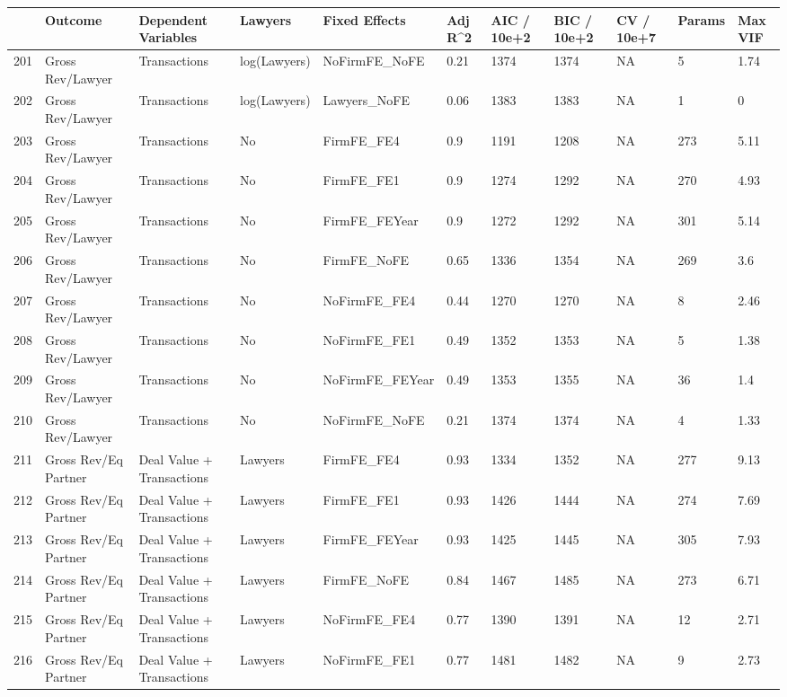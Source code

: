 \documentclass{article}
\begin{document}
\begin{table}[H]
\centering
\begin{tabular}{rllllllllll}
  \hline
 & Outcome & Dependent Variables & Lawyers & Fixed Effects & Adj R^2 & AIC / 10e+2 & BIC / 10e+2 & CV / 10e+7 & Params & Max VIF \\
  \hline
201 & Gross Rev/Lawyer & Transactions & log(Lawyers) & NoFirmFE\_NoFE & 0.21 & 1374 & 1374 & NA & 5 & 1.74 \\
  202 & Gross Rev/Lawyer & Transactions & log(Lawyers) & Lawyers\_NoFE & 0.06 & 1383 & 1383 & NA & 1 & 0 \\
  203 & Gross Rev/Lawyer & Transactions & No & FirmFE\_FE4 & 0.9 & 1191 & 1208 & NA & 273 & 5.11 \\
  204 & Gross Rev/Lawyer & Transactions & No & FirmFE\_FE1 & 0.9 & 1274 & 1292 & NA & 270 & 4.93 \\
  205 & Gross Rev/Lawyer & Transactions & No & FirmFE\_FEYear & 0.9 & 1272 & 1292 & NA & 301 & 5.14 \\
  206 & Gross Rev/Lawyer & Transactions & No & FirmFE\_NoFE & 0.65 & 1336 & 1354 & NA & 269 & 3.6 \\
  207 & Gross Rev/Lawyer & Transactions & No & NoFirmFE\_FE4 & 0.44 & 1270 & 1270 & NA & 8 & 2.46 \\
  208 & Gross Rev/Lawyer & Transactions & No & NoFirmFE\_FE1 & 0.49 & 1352 & 1353 & NA & 5 & 1.38 \\
  209 & Gross Rev/Lawyer & Transactions & No & NoFirmFE\_FEYear & 0.49 & 1353 & 1355 & NA & 36 & 1.4 \\
  210 & Gross Rev/Lawyer & Transactions & No & NoFirmFE\_NoFE & 0.21 & 1374 & 1374 & NA & 4 & 1.33 \\
  211 & Gross Rev/Eq Partner & Deal Value + Transactions & Lawyers & FirmFE\_FE4 & 0.93 & 1334 & 1352 & NA & 277 & 9.13 \\
  212 & Gross Rev/Eq Partner & Deal Value + Transactions & Lawyers & FirmFE\_FE1 & 0.93 & 1426 & 1444 & NA & 274 & 7.69 \\
  213 & Gross Rev/Eq Partner & Deal Value + Transactions & Lawyers & FirmFE\_FEYear & 0.93 & 1425 & 1445 & NA & 305 & 7.93 \\
  214 & Gross Rev/Eq Partner & Deal Value + Transactions & Lawyers & FirmFE\_NoFE & 0.84 & 1467 & 1485 & NA & 273 & 6.71 \\
  215 & Gross Rev/Eq Partner & Deal Value + Transactions & Lawyers & NoFirmFE\_FE4 & 0.77 & 1390 & 1391 & NA & 12 & 2.71 \\
  216 & Gross Rev/Eq Partner & Deal Value + Transactions & Lawyers & NoFirmFE\_FE1 & 0.77 & 1481 & 1482 & NA & 9 & 2.73 \\

\end{tabular}
\end{table}
\end{document}

